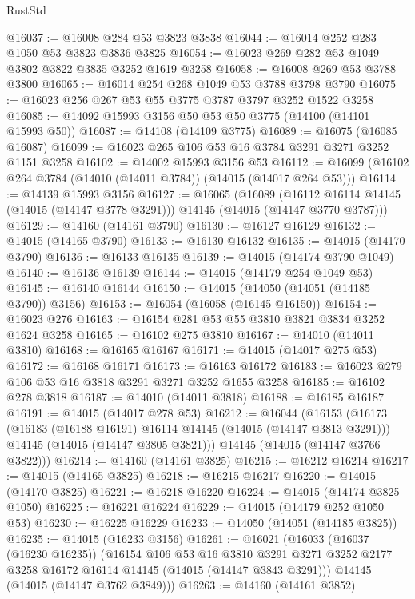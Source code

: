 \begin{lexlean}{RustStd}
\begin{coremodule}
@16037 := @16008 @284 @53 @3823 @3838
@16044 := @16014 @252 @283 @1050 @53 @3823 @3836 @3825
@16054 := @16023 @269 @282 @53 @1049 @3802 @3822 @3835 @3252 @1619 @3258
@16058 := @16008 @269 @53 @3788 @3800
@16065 := @16014 @254 @268 @1049 @53 @3788 @3798 @3790
@16075 := @16023 @256 @267 @53 @55 @3775 @3787 @3797 @3252 @1522 @3258
@16085 := @14092 @15993 @3156 @50 @53 @50 @3775 (@14100 (@14101 @15993 @50))
@16087 := @14108 (@14109 @3775)
@16089 := @16075 (@16085 @16087)
@16099 := @16023 @265 @106 @53 @16 @3784 @3291 @3271 @3252 @1151 @3258
@16102 := @14002 @15993 @3156 @53
@16112 := @16099 (@16102 @264 @3784 (@14010 (@14011 @3784)) (@14015 (@14017 @264 @53)))
@16114 := @14139 @15993 @3156
@16127 := @16065
    (@16089
      (@16112 @16114 @14145 (@14015 (@14147 @3778 @3291)))
      @14145
      (@14015 (@14147 @3770 @3787)))
@16129 := @14160 (@14161 @3790)
@16130 := @16127 @16129
@16132 := @14015 (@14165 @3790)
@16133 := @16130 @16132
@16135 := @14015 (@14170 @3790)
@16136 := @16133 @16135
@16139 := @14015 (@14174 @3790 @1049)
@16140 := @16136 @16139
@16144 := @14015 (@14179 @254 @1049 @53)
@16145 := @16140 @16144
@16150 := @14015 (@14050 (@14051 (@14185 @3790)) @3156)
@16153 := @16054 (@16058 (@16145 @16150))
@16154 := @16023 @276
@16163 := @16154 @281 @53 @55 @3810 @3821 @3834 @3252 @1624 @3258
@16165 := @16102 @275 @3810
@16167 := @14010 (@14011 @3810)
@16168 := @16165 @16167
@16171 := @14015 (@14017 @275 @53)
@16172 := @16168 @16171
@16173 := @16163 @16172
@16183 := @16023 @279 @106 @53 @16 @3818 @3291 @3271 @3252 @1655 @3258
@16185 := @16102 @278 @3818
@16187 := @14010 (@14011 @3818)
@16188 := @16185 @16187
@16191 := @14015 (@14017 @278 @53)
@16212 := @16044
    (@16153
      (@16173
        (@16183 (@16188 @16191) @16114 @14145 (@14015 (@14147 @3813 @3291)))
        @14145
        (@14015 (@14147 @3805 @3821)))
      @14145
      (@14015 (@14147 @3766 @3822)))
@16214 := @14160 (@14161 @3825)
@16215 := @16212 @16214
@16217 := @14015 (@14165 @3825)
@16218 := @16215 @16217
@16220 := @14015 (@14170 @3825)
@16221 := @16218 @16220
@16224 := @14015 (@14174 @3825 @1050)
@16225 := @16221 @16224
@16229 := @14015 (@14179 @252 @1050 @53)
@16230 := @16225 @16229
@16233 := @14050 (@14051 (@14185 @3825))
@16235 := @14015 (@16233 @3156)
@16261 := @16021
    (@16033
      (@16037 (@16230 @16235))
      (@16154
        @106
        @53
        @16
        @3810
        @3291
        @3271
        @3252
        @2177
        @3258
        @16172
        @16114
        @14145
        (@14015 (@14147 @3843 @3291)))
      @14145
      (@14015 (@14147 @3762 @3849)))
@16263 := @14160 (@14161 @3852)

\end{coremodule}
\end{lexlean}
